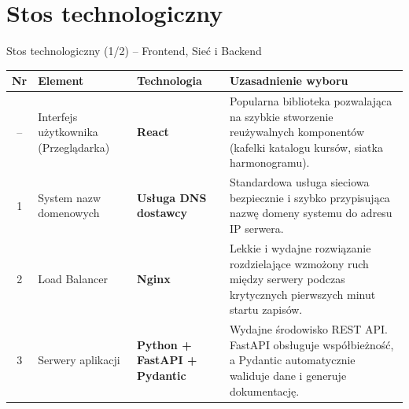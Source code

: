 \documentclass[aspectratio=169, 10pt, xcolor=table]{beamer}
\begin{document}
\section{Stos technologiczny}

\begin{frame}{Stos technologiczny (1/2) -- Frontend, Sieć i Backend}
    \footnotesize
    \begin{tabularx}{\textwidth}{@{} c L{0.22\textwidth} L{0.22\textwidth} Y @{}}
        \toprule
        \textbf{Nr} & \textbf{Element} & \textbf{Technologia} & \textbf{Uzasadnienie wyboru} \\
        \midrule
        -- & Interfejs użytkownika (Przeglądarka) & \textbf{\textcolor{BlueBrand}{React}} & Popularna biblioteka pozwalająca na szybkie stworzenie reużywalnych komponentów (kafelki katalogu kursów, siatka harmonogramu). \\
        1 & System nazw domenowych & \textbf{\textcolor{BlueBrand}{Usługa DNS dostawcy}} & Standardowa usługa sieciowa bezpiecznie i szybko przypisująca nazwę domeny systemu do adresu IP serwera. \\
        2 & Load Balancer & \textbf{\textcolor{BlueBrand}{Nginx}} & Lekkie i wydajne rozwiązanie rozdzielające wzmożony ruch między serwery podczas krytycznych pierwszych minut startu zapisów. \\
        3 & Serwery aplikacji & \textbf{\textcolor{BlueBrand}{Python + FastAPI + Pydantic}} & Wydajne środowisko REST API. FastAPI obsługuje współbieżność, a Pydantic automatycznie waliduje dane i generuje dokumentację. \\
        \bottomrule
    \end{tabularx}
\end{frame}
\end{document}
